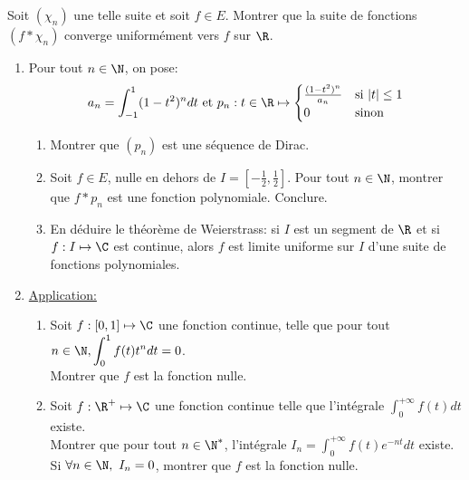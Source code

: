 \documentclass{book}
\begin{document}
	Soit $(\chi_n)$ une telle suite et soit $f\in E$. Montrer que la suite de fonctions $(f*\chi_n)$ converge uniformément vers $f$ sur $\R$.
	\begin{enumerate}[leftmargin=*]
		\setcounter{enumi}{\value{saveenum}}
		\item Pour tout $n\in\N$, on pose: $$a_n=\int_{-1}^1(1-t^2)^ndt \ \text{et} \ p_n:t\in\R\mapsto\begin{cases}\frac{(1-t^2)^n}{a_n} & \mbox{si } |t|\leq1\\0 & \mbox{sinon}\end{cases}$$
		\begin{enumerate}
			\item Montrer que $(p_n)$ est une séquence de Dirac.
			\item Soit $f\in E$, nulle en dehors de $I=\displaystyle\left[-\frac{1}{2},\frac{1}{2}\right]$. Pour tout $n\in\N$, montrer que $f*p_n$ est une fonction polynomiale. Conclure.
			\item En déduire le théorème de Weierstrass: si $I$ est un segment de $\R$ et si $f:I\mapsto\C$ est continue, alors $f$ est limite uniforme sur $I$ d'une suite de fonctions polynomiales.
		\end{enumerate}
		\item \underline{Application:}
		\begin{enumerate}   
			\item Soit $f:[0,1]\mapsto\C$ une fonction continue, telle que pour tout $n\in\N, \displaystyle\int_0^1f(t)t^ndt=0$. 
			\\Montrer que $f$ est la fonction nulle.
			\item Soit $f:\R^+\mapsto\C$ une fonction continue telle que l'intégrale $\displaystyle\int_0^{+\infty}f(t)dt$ existe. \\Montrer que pour tout $n\in\N^*$, l'intégrale $I_n=\displaystyle\int_0^{+\infty}f(t)e^{-nt}dt$ existe. \\Si $\forall n\in\N, \ I_n=0$, montrer que $f$ est la fonction nulle.
		\end{enumerate}
	\end{enumerate}
	
\end{document}
